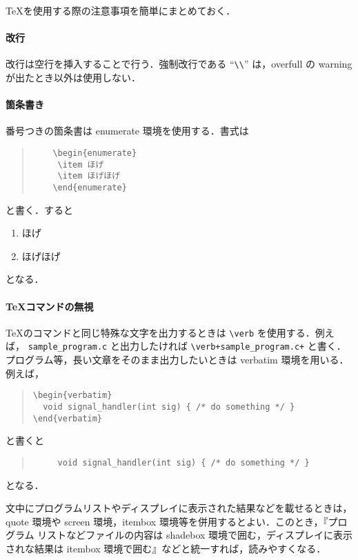 \documentclass[a4j]{jsarticle}  %
\begin{document}
\TeX を使用する際の注意事項を簡単にまとめておく．

\paragraph{改行}
改行は空行を挿入することで行う．強制改行である ``\verb+\\+'' は，overfull の 
warning が出たとき以外は使用しない．

\paragraph{箇条書き}
番号つきの箇条書は enumerate 環境を使用する．書式は
\begin{quote}
\begin{verbatim}
	\begin{enumerate}
	 \item ほげ
	 \item ほげほげ
	\end{enumerate}
\end{verbatim}
\end{quote}
と書く．すると
\begin{enumerate}
 \item ほげ
 \item ほげほげ
\end{enumerate}
となる．

\paragraph{\TeX コマンドの無視}
\TeX のコマンドと同じ特殊な文字を出力するときは \verb+\verb+ を使用する．例えば，
\verb+sample_program.c+ と出力したければ \verb|\verb+sample_program.c+| と書く．
プログラム等，長い文章をそのまま出力したいときは verbatim 環境を用いる．例えば，
\begin{quote}
\verb+\begin{verbatim}+ \\
\verb+  void signal_handler(int sig) { /* do something */ }+ \\
\verb+\end{verbatim}+
\end{quote}
と書くと
\begin{quote}
\begin{verbatim}
	 void signal_handler(int sig) { /* do something */ }
\end{verbatim}
\end{quote}
となる．

文中にプログラムリストやディスプレイに表示された結果などを載せるときは， 
quote 環境や screen 環境，itembox 環境等を併用するとよい．このとき，『プログラム
リストなどファイルの内容は shadebox 環境で囲む，ディスプレイに表示されな結果は 
itembox 環境で囲む』などと統一すれば，読みやすくなる．
\end{document}
